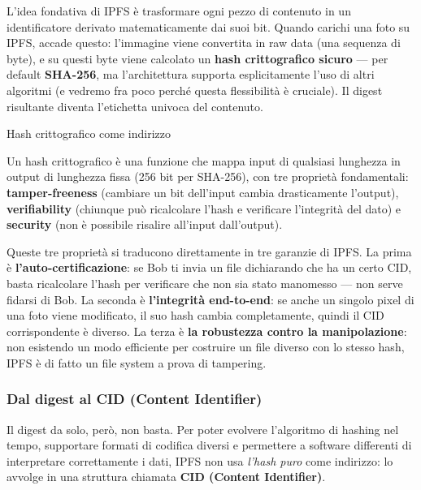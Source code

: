 \documentclass[
  italian,
  openany]{book}
\begin{document}
L'idea fondativa di IPFS è trasformare ogni pezzo di contenuto in un
identificatore derivato matematicamente dai suoi bit. Quando carichi una
foto su IPFS, accade questo: l'immagine viene convertita in raw data
(una sequenza di byte), e su questi byte viene calcolato un \textbf{hash
crittografico sicuro} --- per default \textbf{SHA-256}, ma
l'architettura supporta esplicitamente l'uso di altri algoritmi (e
vedremo fra poco perché questa flessibilità è cruciale). Il digest
risultante diventa l'etichetta univoca del contenuto.

\begin{calloutdefinition}{Hash crittografico come indirizzo}

Un hash crittografico è una funzione che mappa input di qualsiasi
lunghezza in output di lunghezza fissa (256 bit per SHA-256), con tre
proprietà fondamentali: \textbf{tamper-freeness} (cambiare un bit
dell'input cambia drasticamente l'output), \textbf{verifiability}
(chiunque può ricalcolare l'hash e verificare l'integrità del dato) e
\textbf{security} (non è possibile risalire all'input dall'output).

\end{calloutdefinition}

Queste tre proprietà si traducono direttamente in tre garanzie di IPFS.
La prima è \textbf{l'auto-certificazione}: se Bob ti invia un file
dichiarando che ha un certo CID, basta ricalcolare l'hash per verificare
che non sia stato manomesso --- non serve fidarsi di Bob. La seconda è
\textbf{l'integrità end-to-end}: se anche un singolo pixel di una foto
viene modificato, il suo hash cambia completamente, quindi il CID
corrispondente è diverso. La terza è \textbf{la robustezza contro la
manipolazione}: non esistendo un modo efficiente per costruire un file
diverso con lo stesso hash, IPFS è di fatto un file system a prova di
tampering.

\subsubsection{Dal digest al CID (Content
Identifier)}\label{dal-digest-al-cid-content-identifier}

Il digest da solo, però, non basta. Per poter evolvere l'algoritmo di
hashing nel tempo, supportare formati di codifica diversi e permettere a
software differenti di interpretare correttamente i dati, IPFS non usa
\emph{l'hash puro} come indirizzo: lo avvolge in una struttura chiamata
\textbf{CID (Content Identifier)}.
\end{document}
